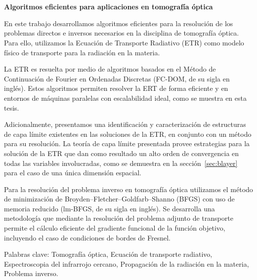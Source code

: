 \pagestyle{empty}
\chapter*{}

\begin{center}
\begin{large}
\textbf{Algoritmos eficientes para aplicaciones en tomografía óptica}
\end{large}
\end{center}

\vspace{1cm}
En este trabajo desarrollamos    
algoritmos eficientes para la resolución de los problemas directos 
e inversos necesarios en la disciplina de tomografía óptica. Para ello, utilizamos la Ecuación de Transporte 
Radiativo (ETR) como modelo físico de transporte para la radiación 
en la materia. 

La ETR es resuelta por medio de algoritmos basados en el Método  
de Continuación de Fourier en Ordenadas Discretas (FC-DOM, de su sigla en inglés). Estos algoritmos 
permiten resolver la ERT de forma eficiente y en entornos de máquinas paralelas 
con escalabilidad ideal, como se muestra en esta tesis. 

Adicionalmente, presentamos una identificación y caracterización de estructuras 
de capa límite existentes en las soluciones de la ETR, en conjunto con un método para su resolución. La teoría 
de capa límite presentada provee estrategias para la solución de la ETR 
que dan como resultado un 
alto orden de convergencia en todas las variables involucradas,
como se demuestra en la sección~\ref{sec:blayer} para el caso de una única dimensión espacial.

Para la resolución del problema inverso en tomografía óptica utilizamos el método de minimización 
de Broyden–Fletcher–Goldfarb–Shanno (BFGS) con uso de memoria reducido 
(lm-BFGS, de su sigla en inglés). 
Se desarrolla una metodología que mediante la resolución del 
problema adjunto de transporte permite el cálculo eficiente del gradiente 
funcional de la función objetivo, incluyendo el caso de condiciones de bordes 
de Fresnel.


\vspace{1cm}
\noindent
Palabras clave: 
Tomografía óptica,
Ecuación de transporte radiativo, 
Espectroscopia del infrarrojo cercano, 
Propagación de la radiación en la materia,
Problema inverso.
\pagestyle{empty}
